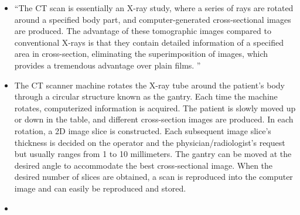 \documentclass[11pt]{article}
\begin{document}
\begin{itemize}
    \item ``The CT scan is essentially an X-ray study, where a series of rays are rotated around a specified body part, and computer-generated cross-sectional images are produced. The advantage of these tomographic images compared to conventional X-rays is that they contain detailed information of a specified area in cross-section, eliminating the superimposition of images, which provides a tremendous advantage over plain films. ''
    \item The CT scanner machine rotates the X-ray tube around the patient's body through a circular structure known as the gantry. Each time the machine rotates, computerized information is acquired. The patient is slowly moved up or down in the table, and different cross-section images are produced. In each rotation, a 2D image slice is constructed. Each subsequent image slice's thickness is decided on the operator and the physician/radiologist's request but usually ranges from 1 to 10 millimeters. The gantry can be moved at the desired angle to accommodate the best cross-sectional image. When the desired number of slices are obtained, a scan is reproduced into the computer image and can easily be reproduced and stored.
    \item 
\end{itemize}

\printbibliography
\end{document}
